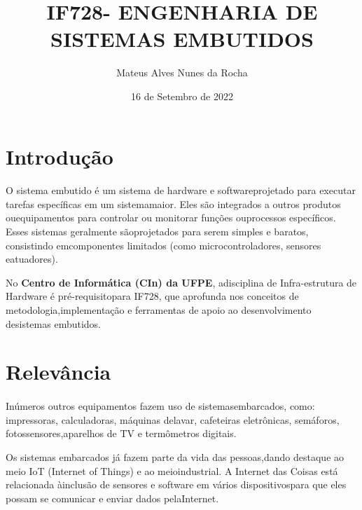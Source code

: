 \documentclass[article]{abntex2}
\title{IF728- ENGENHARIA DE SISTEMAS EMBUTIDOS}
\author{Mateus Alves Nunes da Rocha}
\date{16 de Setembro de 2022}
\begin{document}
\maketitle
\section{Introdução}

\paragraph{}
O sistema embutido é um sistema de hardware e softwareprojetado para executar tarefas específicas em um sistemamaior. Eles são integrados a outros produtos ouequipamentos para controlar ou monitorar funções ouprocessos específicos. Esses sistemas geralmente sãoprojetados para serem simples e baratos, consistindo emcomponentes limitados (como microcontroladores, sensores eatuadores). \cite{embarcados}

No \textbf{Centro de Informática (CIn) da UFPE}, adisciplina de Infra-estrutura de Hardware é pré-requisitopara IF728, que aprofunda nos conceitos de metodologia,implementação e ferramentas de apoio ao desenvolvimento desistemas embutidos.
    
\section{Relevância}

\paragraph{}
Inúmeros outros equipamentos fazem uso de sistemasembarcados, como: impressoras, calculadoras, máquinas delavar, cafeteiras eletrônicas, semáforos, fotossensores,aparelhos de TV e termômetros digitais.
    
Os sistemas embarcados já fazem parte da vida das pessoas,dando destaque ao meio IoT (Internet of Things) e ao meioindustrial. A Internet das Coisas está relacionada àinclusão de sensores e software em vários dispositivospara que eles possam se comunicar e enviar dados pelaInternet. \cite{inove}
    
\end{document}
